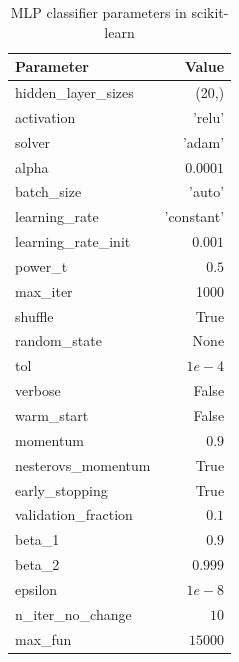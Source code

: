 \begin{table}[H]
    \footnotesize
    \centering
    \caption{MLP classifier parameters in scikit-learn \cite{noauthor_sklearnneural_networkmlpclassifier_nodate}} \label{tab:mlp_param} 
    \begin{tabular}{lr}\toprule
        Parameter & Value \\\midrule
        hidden\_layer\_sizes & (20,) \\
        activation & 'relu' \\
        solver & 'adam' \\
        alpha & $0.0001$ \\
        batch\_size & 'auto' \\
        learning\_rate & 'constant' \\
        learning\_rate\_init & $0.001$ \\
        power\_t & $0.5$ \\
        max\_iter & 1000 \\
        shuffle & True \\
        random\_state & None \\
        tol & $1e-4$ \\
        verbose & False \\
        warm\_start & False \\
        momentum & $0.9$ \\
        nesterovs\_momentum & True \\
        early\_stopping & True \\
        validation\_fraction & $0.1$ \\
        beta\_1 & $0.9$ \\
        beta\_2 & $0.999$ \\
        epsilon & $1e-8$ \\
        n\_iter\_no\_change & $10$ \\
        max\_fun & $15000$ \\\bottomrule
    \end{tabular}
\end{table}

